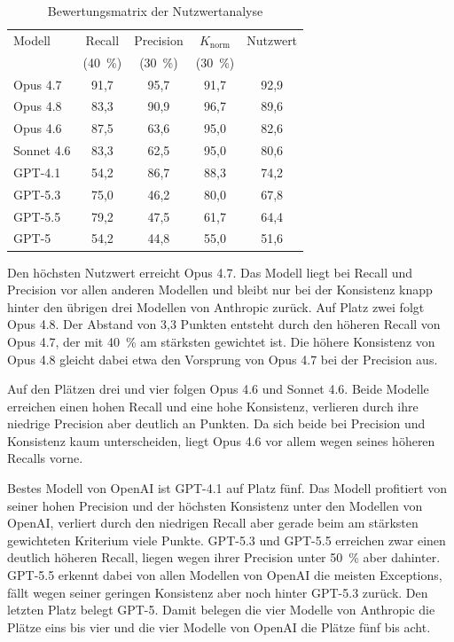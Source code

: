 \begin{table}[H]
  \centering
  \begin{tabular}{lcccc}
    \hline
    Modell & Recall & Precision & $K_{\text{norm}}$ & Nutzwert \\
           & (40~\%) & (30~\%) & (30~\%) & \\
    \hline
    Opus 4.7   & 91,7 & 95,7 & 91,7 & 92,9 \\
    Opus 4.8   & 83,3 & 90,9 & 96,7 & 89,6 \\
    Opus 4.6   & 87,5 & 63,6 & 95,0 & 82,6 \\
    Sonnet 4.6 & 83,3 & 62,5 & 95,0 & 80,6 \\
    GPT-4.1    & 54,2 & 86,7 & 88,3 & 74,2 \\
    GPT-5.3    & 75,0 & 46,2 & 80,0 & 67,8 \\
    GPT-5.5    & 79,2 & 47,5 & 61,7 & 64,4 \\
    GPT-5      & 54,2 & 44,8 & 55,0 & 51,6 \\
    \hline
  \end{tabular}
    \caption{Bewertungsmatrix der Nutzwertanalyse}
    \label{tab:bewertungsmatrix}
\end{table}

Den höchsten Nutzwert erreicht Opus 4.7. Das Modell liegt bei Recall und Precision vor allen anderen Modellen und bleibt nur bei der Konsistenz knapp hinter den übrigen drei Modellen von Anthropic zurück. Auf Platz zwei folgt Opus 4.8. Der Abstand von 3,3 Punkten entsteht durch den höheren Recall von Opus 4.7, der mit 40~\% am stärksten gewichtet ist. Die höhere Konsistenz von Opus 4.8 gleicht dabei etwa den Vorsprung von Opus 4.7 bei der Precision aus.

Auf den Plätzen drei und vier folgen Opus 4.6 und Sonnet 4.6. Beide Modelle erreichen einen hohen Recall und eine hohe Konsistenz, verlieren durch ihre niedrige Precision aber deutlich an Punkten. Da sich beide bei Precision und Konsistenz kaum unterscheiden, liegt Opus 4.6 vor allem wegen seines höheren Recalls vorne.

Bestes Modell von OpenAI ist GPT-4.1 auf Platz fünf. Das Modell profitiert von seiner hohen Precision und der höchsten Konsistenz unter den Modellen von OpenAI, verliert durch den niedrigen Recall aber gerade beim am stärksten gewichteten Kriterium viele Punkte. GPT-5.3 und GPT-5.5 erreichen zwar einen deutlich höheren Recall, liegen wegen ihrer Precision unter 50~\% aber dahinter. GPT-5.5 erkennt dabei von allen Modellen von OpenAI die meisten Exceptions, fällt wegen seiner geringen Konsistenz aber noch hinter GPT-5.3 zurück. Den letzten Platz belegt GPT-5. Damit belegen die vier Modelle von Anthropic die Plätze eins bis vier und die vier Modelle von OpenAI die Plätze fünf bis acht.


